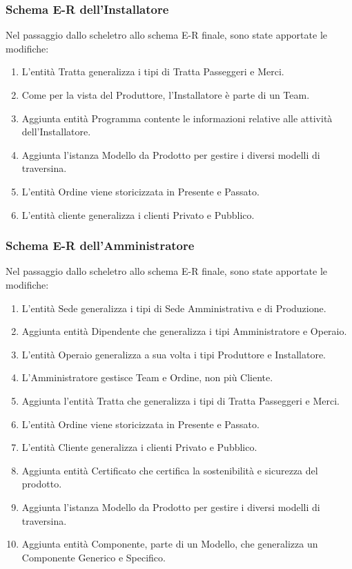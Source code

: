 \documentclass{article}
\begin{document}
\subsubsection{Schema E-R dell'Installatore}
Nel passaggio dallo scheletro allo schema E-R finale, sono state apportate le modifiche:
\begin{enumerate}
    \item L'entità Tratta generalizza i tipi di Tratta Passeggeri e Merci.
    \item Come per la vista del Produttore, l'Installatore è parte di un Team.
    \item Aggiunta entità Programma contente le informazioni relative alle attività dell'Installatore.
    \item Aggiunta l'istanza Modello da Prodotto per gestire i diversi modelli di traversina.
    \item L'entità Ordine viene storicizzata in Presente e Passato.
    \item L'entità cliente generalizza i clienti Privato e Pubblico.
\end{enumerate}





\subsubsection{Schema E-R dell'Amministratore}
Nel passaggio dallo scheletro allo schema E-R finale, sono state apportate le modifiche:
\begin{enumerate}
    \item L'entità Sede generalizza i tipi di Sede Amministrativa e di Produzione.
    \item Aggiunta entità Dipendente che generalizza i tipi Amministratore e Operaio.
    \item L'entità Operaio generalizza a sua volta i tipi Produttore e Installatore.
    \item L'Amministratore gestisce Team e Ordine, non più Cliente.
    \item Aggiunta l'entità Tratta che generalizza i tipi di Tratta Passeggeri e Merci.
    \item L'entità Ordine viene storicizzata in Presente e Passato.
    \item L'entità Cliente generalizza i clienti Privato e Pubblico.
    \item Aggiunta entità Certificato che certifica la sostenibilità e sicurezza del prodotto.
    \item Aggiunta l'istanza Modello da Prodotto per gestire i diversi modelli di traversina.
    \item Aggiunta entità Componente, parte di un Modello, che generalizza un Componente Generico e Specifico.
\end{enumerate}
\end{document}
